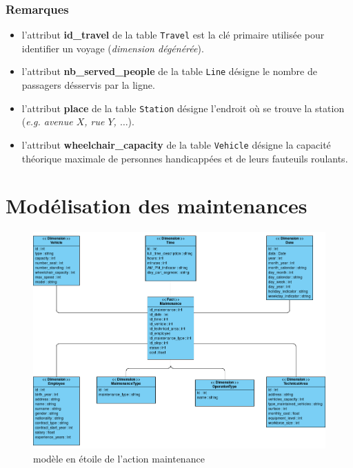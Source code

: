 \documentclass[a4paper,12pt]{report}
\begin{document}
\subsubsection{Remarques}
\begin{itemize}
  \item l'attribut \textbf{id\_travel} de la table \texttt{Travel} est la clé primaire utilisée pour identifier un voyage (\textit{dimension dégénérée}).
  \item l'attribut \textbf{nb\_served\_people} de la table \texttt{Line} désigne le nombre de passagers désservis par la ligne.
  \item l'attribut \textbf{place} de la table \texttt{Station} désigne l'endroit où se trouve la station (\textit{e.g. avenue $X$, rue $Y$, $\dots$}).
  \item l'attribut \textbf{wheelchair\_capacity} de la table \texttt{Vehicle} désigne la capacité théorique maximale de personnes handicappées et de leurs fauteuils roulants.
\end{itemize}

\section{Modélisation des maintenances}
\begin{figure}[!ht]
  \centering
  \includegraphics[scale=0.4]{images/maintenance_datamart.png}
  \caption{modèle en étoile de l'action \og maintenance \fg}
\end{figure}
\end{document}
